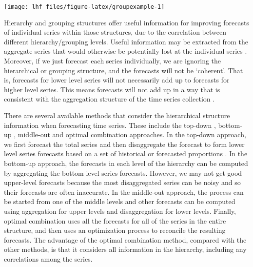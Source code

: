 \documentclass[11pt,a4paper,]{article}
\let\origfigure\figure
\let\endorigfigure\endfigure
\renewenvironment{figure}[1][2] {
    \expandafter\origfigure\expandafter[!htbp]
} {
    \endorigfigure
}
\begin{document}
\begin{figure}

{\centering \texttt{[image: lhf\_files/figure-latex/groupexample-1]} 

}

\caption{An example of a two level grouped structure.}\label{fig:groupexample}
\end{figure}

Hierarchy and grouping structures offer useful information for improving forecasts of individual series within those structures, due to the correlation between different hierarchy/grouping levels. Useful information may be extracted from the aggregate series that would otherwise be potentially lost at the individual series \autocite{syntetos2016supply}. Moreover, if we just forecast each series individually, we are ignoring the hierarchical or grouping structure, and the forecasts will not be `coherent'. That is, forecasts for lower level series will not necessarily add up to forecasts for higher level series. This means forecasts will not add up in a way that is consistent with the aggregation structure of the time series collection \autocite{fpp2}.

There are several available methods that consider the hierarchical structure information when forecasting time series. These include the top-down \autocite{gross1990disaggregation,fliedner2001hierarchical}, bottom-up \autocite{kahn1998revisiting}, middle-out and optimal combination \autocite{hyndman2011optimal} approaches. In the top-down approach, we first forecast the total series and then disaggregate the forecast to form lower level series forecasts based on a set of historical or forecasted proportions \autocite[for details see][]{athanasopoulos2009hierarchical}. In the bottom-up approach, the forecasts in each level of the hierarchy can be computed by aggregating the bottom-level series forecasts. However, we may not get good upper-level forecasts because the most disaggregated series can be noisy and so their forecasts are often inaccurate. In the middle-out approach, the process can be started from one of the middle levels and other forecasts can be computed using aggregation for upper levels and disaggregation for lower levels. Finally, optimal combination uses all the forecasts for all of the series in the entire structure, and then uses an optimization process to reconcile the resulting forecasts. The advantage of the optimal combination method, compared with the other methods, is that it considers all information in the hierarchy, including any correlations among the series.
\end{document}
